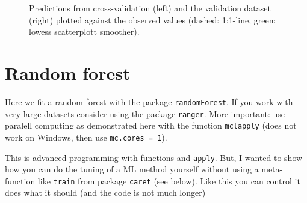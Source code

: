 \documentclass[11pt,a4paper,twoside]{article}\usepackage[]{graphicx}\usepackage[]{color}
\newenvironment{knitrout}{}{} %
\begin{document}
\begin{knitrout}
\begin{figure}
{}

\caption[Predictions from cross-validation (left) and the validation dataset (right) plotted against the observed values (dashed]{Predictions from cross-validation (left) and the validation dataset (right) plotted against the observed values (dashed: 1:1-line, green: lowess scatterplott smoother).}\label{fig:svm-validation-plots}
\end{figure}


\end{knitrout}


\clearpage 
\section{Random forest}

Here we fit a random forest with the package \texttt{randomForest}. If you work with very large datasets consider using the package \texttt{ranger}. More important: use paralell computing as demonstrated here with the function \texttt{mclapply} (does not work on Windows, then use \texttt{mc.cores = 1}). 

This is advanced programming with functions and \texttt{apply}. But, I wanted to show how you can do the tuning of a ML method yourself without using a meta-function like \texttt{train} from package \texttt{caret} (see below). Like this you can control it does what it should (and the code is not much longer)
\end{document}
